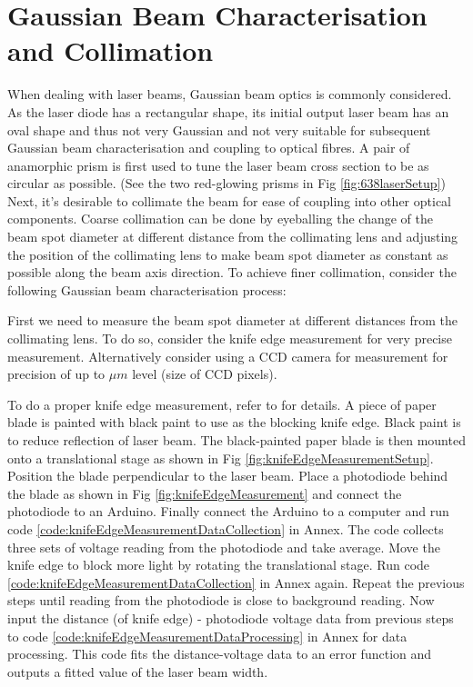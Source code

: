 \documentclass[12pt]{report}
\begin{document}
\section{Gaussian Beam Characterisation and Collimation}
When dealing with laser beams, Gaussian beam optics is commonly considered. As the laser diode has a rectangular shape, its initial output laser beam has an oval shape and thus not very Gaussian and not very suitable for subsequent Gaussian beam characterisation and coupling to optical fibres. A pair of anamorphic prism is first used to tune the laser beam cross section to be as circular as possible. (See the two red-glowing prisms in Fig \ref{fig:638laserSetup}) Next, it's desirable to collimate the beam for ease of coupling into other optical components. Coarse collimation can be done by eyeballing the change of the beam spot diameter at different distance from the collimating lens and adjusting the position of the collimating lens to make beam spot diameter as constant as possible along the beam axis direction. To achieve finer collimation, consider the following Gaussian beam characterisation process: 
\par
First we need to measure the beam spot diameter at different distances from the collimating lens. To do so, consider the knife edge measurement for very precise measurement. Alternatively consider using a CCD camera for measurement for precision of up to $\mu m$ level (size of CCD pixels). 
\par
To do a proper knife edge measurement, refer to \cite{KnifeEdgeMeasurement} for details. A piece of paper blade is painted with black paint to use as the blocking knife edge. Black paint is to reduce reflection of laser beam. The black-painted paper blade is then mounted onto a translational stage as shown in Fig \ref{fig:knifeEdgeMeasurementSetup}. Position the blade perpendicular to the laser beam. Place a photodiode behind the blade as shown in Fig \ref{fig:knifeEdgeMeasurement} and connect the photodiode to an Arduino. Finally connect the Arduino to a computer and run code \ref{code:knifeEdgeMeasurementDataCollection} in Annex. The code collects three sets of voltage reading from the photodiode and take average. Move the knife edge to block more light by rotating the translational stage. Run code \ref{code:knifeEdgeMeasurementDataCollection} in Annex again. Repeat the previous steps until reading from the photodiode is close to background reading. Now input the distance (of knife edge) - photodiode voltage data from previous steps to code \ref{code:knifeEdgeMeasurementDataProcessing} in Annex for data processing. This code fits the distance-voltage data to an error function and outputs a fitted value of the laser beam width. 
\end{document}
